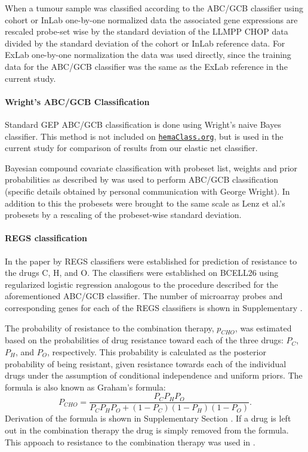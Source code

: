 \documentclass[10pt,letterpaper]{article}
\newcommand{\hemaClass}{\href{http://hemaClass.org}{\texttt{hemaClass.org}}}
\begin{document}
When a tumour sample was classified according to the ABC/GCB classifier using cohort or InLab one-by-one normalized data the associated gene expressions are rescaled probe-set wise by the standard deviation of the LLMPP CHOP data divided by the standard deviation of the cohort or InLab reference data. For ExLab one-by-one normalization the data was used directly, since the training data for the ABC/GCB classifier was the same as the ExLab reference in the current study.

\paragraph{Wright's ABC/GCB Classification}
Standard GEP ABC/GCB classification is done using Wright's naive Bayes classifier. This method is not included on \hemaClass{}, but is used in the current study for comparison of results from our elastic net classifier.

Bayesian compound covariate classification \cite{Wright2003} with probeset list, weights and prior probabilities as described by \cite{Lenz2008a} was used to perform ABC/GCB classification (specific details obtained by personal communication with George Wright). In addition to this the probesets were brought to the same scale as Lenz et al.'s \cite{Lenz2008a} probesets by a rescaling of the probeset-wise standard deviation.


\paragraph{REGS classification}
\label{sec:regsmethods}
In the paper by \cite{Falgreen2015} REGS classifiers were established for prediction of resistance to the drugs C, H, and O.
The classifiers were established on BCELL26 using regularized logistic regression analogous to the procedure described for the aforementioned ABC/GCB classifier. The number of microarray probes and corresponding genes for each of the REGS classifiers is shown in Supplementary .

The probability of resistance to the combination therapy, $p_{CHO}$, was estimated based on the probabilities of drug resistance toward each of the three drugs: $P_C$, $P_H$, and $P_O$, respectively.
This probability is calculated as the posterior probability of being resistant, given resistance towards each of the individual drugs under the assumption of conditional independence and uniform priors.
The formula is also known as Graham's formula:
\begin{equation*}
P_{CHO} = \frac{P_C P_H P_O}{P_C P_H P_O + (1 - P_C)(1 - P_H)(1 - P_O)}.
\end{equation*}
Derivation of the formula is shown in Supplementary Section .
If a drug is left out in the combination therapy the drug is simply removed from the formula.
This appoach to resistance to the combination therapy was used in \cite{Falgreen2015}.
\end{document}

